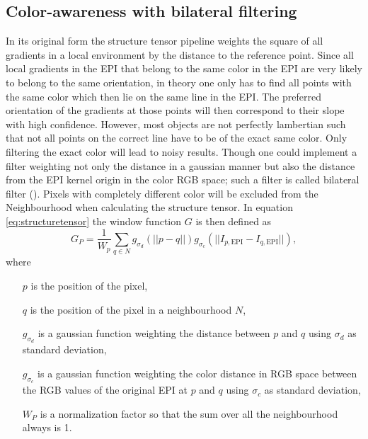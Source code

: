 \documentclass  [
  paper    = a4,
  BCOR     = 10mm,
  twoside,
  fontsize = 12pt,
  fleqn,
  toc      = bibnumbered,
  toc      = listofnumbered,
  numbers  = noendperiod,
  headings = normal,
  listof   = leveldown,
  version  = 3.03
]                                       {scrreprt}
\begin{document}
 \subsection{Color-awareness with bilateral filtering}
 \label{sec:bilateral}
 In its original form the structure tensor pipeline weights the square of all gradients in a local environment by the distance to the reference point. Since all local gradients in the EPI that belong to the same color in the EPI are very likely to belong to the same orientation, in theory one only has to find all points with the same color which then lie on the same line in the EPI. The preferred orientation of the gradients at those points will then correspond to their slope with high confidence. However, most objects are not perfectly lambertian such that not all points on the correct line have to be of the exact same color. Only filtering the exact color will lead to noisy results. Though one could implement a filter weighting not only the distance in a gaussian manner but also the distance from the  EPI kernel origin in the color RGB space; such a filter is called \glqq bilateral filter \grqq (\cite{tomasi1998bilateral}). Pixels with completely different color will be excluded from the Neighbourhood when calculating the structure tensor. In equation \ref{eq:structuretensor} the window function $G$ is then defined as 
 \begin{equation}\label{key}
 G_P = \frac{1}{W_p}\sum_{q\in N} g_{\sigma_d}(||p-q||) g_{\sigma_c}(||I_{p, \text{EPI}}-I_{q, \text{EPI}}||),
 \end{equation}
 where
 \begin{itemize}
 	\item[$p$] is the position of the pixel,
 	\item[$q$] is the position of the pixel in a neighbourhood $N$,
 	\item[ $g_{\sigma_d}$] is a gaussian function weighting the distance between $p$ and $q$ using $\sigma_d$ as standard deviation,
 	\item[ $g_{\sigma_c}$] is a gaussian function weighting the color distance in RGB space between the  RGB values of the original EPI at $p$ and $q$ using $\sigma_c$ as standard deviation,
 	\item[$W_P$] is a normalization factor so that the sum over all the neighbourhood always is 1. 
 \end{itemize}
\end{document}
